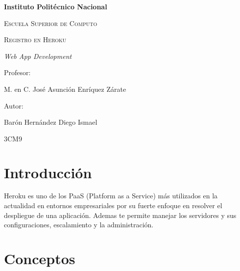 \documentclass{article}
\begin{document}
	\begin{titlepage}
		\centering
		{\bfseries\LARGE Instituto Politécnico Nacional \par}
		\vspace{1cm}
		{\scshape\Large Escuela Superior de Computo \par}
		\vspace{3cm}
		{\scshape\Huge Registro en Heroku \par}
		\vspace{3cm}
		{\itshape\Large Web App Development \par}
		\vfill
		{\Large Profesor: \par}
		{\Large M. en C. José Asunción Enríquez Zárate \par}
		\vspace{1cm}
		{\Large Autor: \par}
		{\Large Barón Hernández Diego Ismael \par}
		\vfill
		{\Large 3CM9 \par}
	\end{titlepage}
	\newpage
	\tableofcontents
	\newpage
	\section{Introducción}
		Heroku es uno de los PaaS (Platform as a Service) más utilizados en la actualidad en entornos empresariales por su fuerte enfoque en resolver el despliegue de una aplicación. Ademas te permite manejar los servidores y sus configuraciones, escalamiento y la administración.
	\section{Conceptos}
\end{document}

